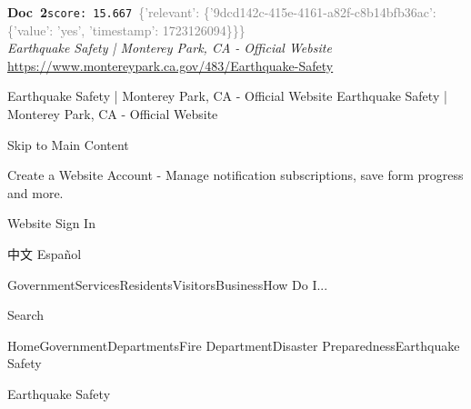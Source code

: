 \documentclass[a4paper,11pt]{article}
\begin{document}
\begin{docenv}
{\footnotesize\textcolor{doccolor}{\textbf{Doc~2}}}\hfill{\tiny\texttt{score:~15.667}}\ {\tiny\textcolor{gray}{\{'relevant': \{'9dcd142c-415e-4161-a82f-c8b14bfb36ac': \{'value': 'yes', 'timestamp': 1723126094\}\}\}}}\\[3pt]
{\small\textit{Earthquake Safety | Monterey Park, CA - Official Website}}\\[2pt]
{\tiny\url{https://www.montereypark.ca.gov/483/Earthquake-Safety}}\\[4pt]
{\footnotesize Earthquake Safety | Monterey Park, CA - Official Website
Earthquake Safety | Monterey Park, CA - Official Website

 

Skip to Main Content

Create a Website Account - Manage notification subscriptions, save form progress and more.   

Website Sign In

 

 中文 Español

 
 
 

GovernmentServicesResidentsVisitorsBusinessHow Do I...

 

 

 

 

 

 

 

 

 
 
 

 

Search

 
 
 

 
HomeGovernmentDepartmentsFire DepartmentDisaster PreparednessEarthquake Safety



Earthquake Safety	

}
\end{docenv}
\end{document}
